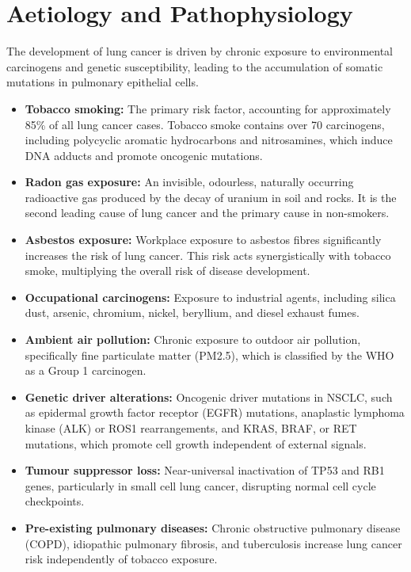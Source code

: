 \section*{Aetiology and Pathophysiology}
The development of lung cancer is driven by chronic exposure to environmental carcinogens and genetic susceptibility, leading to the accumulation of somatic mutations in pulmonary epithelial cells.
\begin{itemize}
    \item \textbf{Tobacco smoking:} The primary risk factor, accounting for approximately 85\% of all lung cancer cases. Tobacco smoke contains over 70 carcinogens, including polycyclic aromatic hydrocarbons and nitrosamines, which induce DNA adducts and promote oncogenic mutations.
    \item \textbf{Radon gas exposure:} An invisible, odourless, naturally occurring radioactive gas produced by the decay of uranium in soil and rocks. It is the second leading cause of lung cancer and the primary cause in non-smokers.
    \item \textbf{Asbestos exposure:} Workplace exposure to asbestos fibres significantly increases the risk of lung cancer. This risk acts synergistically with tobacco smoke, multiplying the overall risk of disease development.
    \item \textbf{Occupational carcinogens:} Exposure to industrial agents, including silica dust, arsenic, chromium, nickel, beryllium, and diesel exhaust fumes.
    \item \textbf{Ambient air pollution:} Chronic exposure to outdoor air pollution, specifically fine particulate matter (PM2.5), which is classified by the WHO as a Group 1 carcinogen.
    \item \textbf{Genetic driver alterations:} Oncogenic driver mutations in NSCLC, such as epidermal growth factor receptor (EGFR) mutations, anaplastic lymphoma kinase (ALK) or ROS1 rearrangements, and KRAS, BRAF, or RET mutations, which promote cell growth independent of external signals.
    \item \textbf{Tumour suppressor loss:} Near-universal inactivation of TP53 and RB1 genes, particularly in small cell lung cancer, disrupting normal cell cycle checkpoints.
    \item \textbf{Pre-existing pulmonary diseases:} Chronic obstructive pulmonary disease (COPD), idiopathic pulmonary fibrosis, and tuberculosis increase lung cancer risk independently of tobacco exposure.
\end{itemize}

